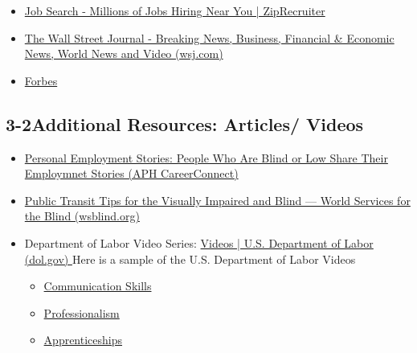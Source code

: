\begin{itemize}[leftmargin=*]
\begin{itemize}
\item \href{https://www.ziprecruiter.com/search-jobs?tsid=101050007&utm_source=dgljs|bing-search|cmp-396131150|adg-1254543268869339|kw-kwd-78409208661568:loc-190|mt-e|device-c|cr-78409109849992|uid-08a564f52ea21ef2af2d06534b6fc1dc&utm_medium=cpc&msclkid=08a564f52ea21ef2af2d06534b6fc1dc}{Job Search - Millions of Jobs Hiring Near You | ZipRecruiter}
\item \href{https://www.wsj.com/}{The Wall Street Journal - Breaking News, Business, Financial \& Economic News, World News and Video (wsj.com)}
\item \href{https://www.forbes.com/?sh=36ffc04c2254}{Forbes}
\end{itemize}\end{itemize}
\pagebreak \subsection*{3-2\quad Additional Resources: Articles/ Videos}
\begin{itemize}[leftmargin=*]
\item \href{https://aphcareerconnect.org/succeed-at-work/our-stories/}{Personal Employment Stories: People Who Are Blind or Low Share Their Employmnet Stories (APH CareerConnect)}
\item \href{https://www.wsblind.org/blog/2020/8/20/public-transportation-tips-for-the-blind-and-visually-impaired}{Public Transit Tips for the Visually Impaired and Blind — World Services for the Blind (wsblind.org)}
\item Department of Labor Video Series: \href{https://www.dol.gov/agencies/odep/program-areas/individuals/youth/transition/soft-skills/videos}{Videos | U.S. Department of Labor (dol.gov) }
Here is a sample of the U.S. Department of Labor Videos
\begin{itemize}
\item \href{https://www.youtube.com/watch?v=X0voPlW2pSs}{Communication Skills} 
\item \href{https://www.youtube.com/watch?v=7dPWVjQSad4}{Professionalism }
\item \href{https://www.youtube.com/watch?v=OyLlS_XF9to}{Apprenticeships}
\end{itemize}\end{itemize}